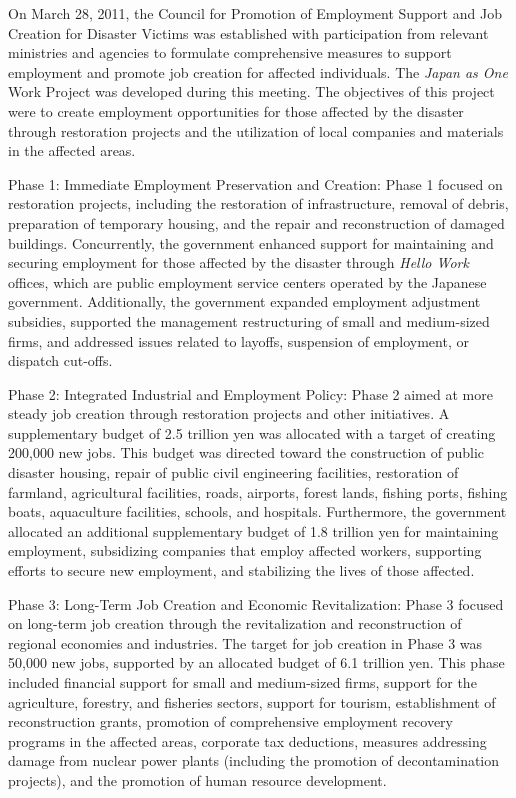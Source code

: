 \documentclass[a4paper,12pt]{article}
\begin{document}
On March 28, 2011, the Council for Promotion of Employment Support and Job Creation for Disaster Victims was established with participation from relevant ministries and agencies to formulate comprehensive measures to support employment and promote job creation for affected individuals. The \textit{Japan as One} Work Project was developed during this meeting. The objectives of this project were to create employment opportunities for those affected by the disaster through restoration projects and the utilization of local companies and materials in the affected areas.

Phase 1: Immediate Employment Preservation and Creation: 
Phase 1 focused on restoration projects, including the restoration of infrastructure, removal of debris, preparation of temporary housing, and the repair and reconstruction of damaged buildings. Concurrently, the government enhanced support for maintaining and securing employment for those affected by the disaster through \textit{Hello Work} offices, which are public employment service centers operated by the Japanese government. Additionally, the government expanded employment adjustment subsidies, supported the management restructuring of small and medium-sized firms, and addressed issues related to layoffs, suspension of employment, or dispatch cut-offs.

Phase 2: Integrated Industrial and Employment Policy:
Phase 2 aimed at more steady job creation through restoration projects and other initiatives. A supplementary budget of 2.5 trillion yen was allocated with a target of creating 200,000 new jobs. This budget was directed toward the construction of public disaster housing, repair of public civil engineering facilities, restoration of farmland, agricultural facilities, roads, airports, forest lands, fishing ports, fishing boats, aquaculture facilities, schools, and hospitals. Furthermore, the government allocated an additional supplementary budget of 1.8 trillion yen for maintaining employment, subsidizing companies that employ affected workers, supporting efforts to secure new employment, and stabilizing the lives of those affected.

Phase 3: Long-Term Job Creation and Economic Revitalization:
Phase 3 focused on long-term job creation through the revitalization and reconstruction of regional economies and industries. The target for job creation in Phase 3 was 50,000 new jobs, supported by an allocated budget of 6.1 trillion yen. This phase included financial support for small and medium-sized firms, support for the agriculture, forestry, and fisheries sectors, support for tourism, establishment of reconstruction grants, promotion of comprehensive employment recovery programs in the affected areas, corporate tax deductions, measures addressing damage from nuclear power plants (including the promotion of decontamination projects), and the promotion of human resource development.
\end{document}
